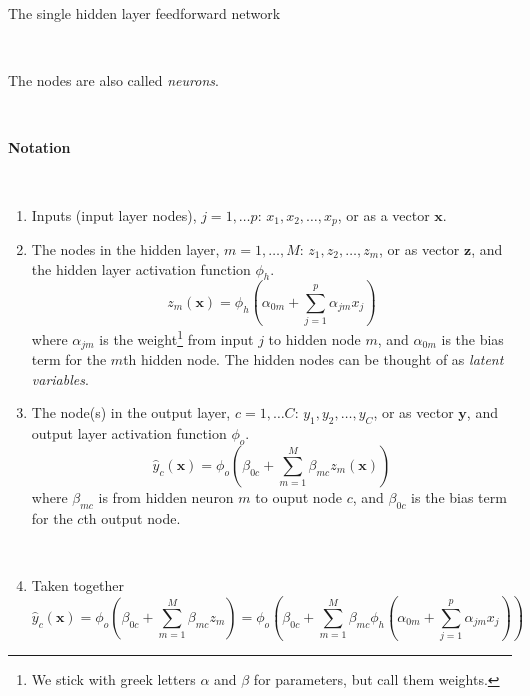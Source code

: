 \documentclass[10pt,ignorenonframetext,]{beamer}
\providecommand{\tightlist}{%
  \setlength{\itemsep}{0pt}\setlength{\parskip}{0pt}}
\begin{document}
\begin{frame}

\begin{block}{The single hidden layer feedforward network}

\(~\)

The nodes are also called \emph{neurons}.

\(~\)

\textbf{Notation}

\(~\)

\begin{enumerate}
\tightlist
\item
  Inputs (input layer nodes), \(j=1,\dots p\):
  \(x_1, x_2, \ldots, x_p\), or as a vector \({\boldsymbol x}\).
\item
  The nodes in the hidden layer, \(m=1,\ldots, M\):
  \(z_1, z_2, \ldots, z_m\), or as vector \({\boldsymbol z}\), and the
  hidden layer activation function \(\phi_h\). \[
  z_m({\boldsymbol x})=\phi_h(\alpha_{0m}+\sum_{j=1}^p \alpha_{jm}x_{j})
  \] where \(\alpha_{jm}\) is the
  weight\footnote{We stick with greek letters $\alpha$ and $\beta$ for parameters, but call them weights.}
  from input \(j\) to hidden node \(m\), and \(\alpha_{0m}\) is the bias
  term for the \(m\)th hidden node. The hidden nodes can be thought of
  as \emph{latent variables}.
\end{enumerate}

\end{block}

\end{frame}

\begin{frame}

\begin{enumerate}
\setcounter{enumi}{2}
\tightlist
\item
  The node(s) in the output layer, \(c=1,\ldots C\):
  \(y_1, y_2, \ldots, y_C\), or as vector \({\boldsymbol y}\), and
  output layer activation function \(\phi_o\). \[
  \hat{y}_c({\boldsymbol x})=\phi_o(\beta_{0c}+\sum_{m=1}^M \beta_{mc}z_{m}({\boldsymbol x}))
  \] where \(\beta_{mc}\) is from hidden neuron \(m\) to ouput node
  \(c\), and \(\beta_{0c}\) is the bias term for the \(c\)th output
  node.
\end{enumerate}

\(~\)

\begin{enumerate}
\setcounter{enumi}{3}
\tightlist
\item
  Taken together \[
  \hat{y}_c({\boldsymbol x})=\phi_o(\beta_{0c}+\sum_{m=1}^M \beta_{mc}z_{m})=\phi_o(\beta_{0c}+\sum_{m=1}^M \beta_{mc}\phi_h(\alpha_{0m}+\sum_{j=1}^p \alpha_{jm}x_{j}))
  \]
\end{enumerate}

\end{frame}
\end{document}
